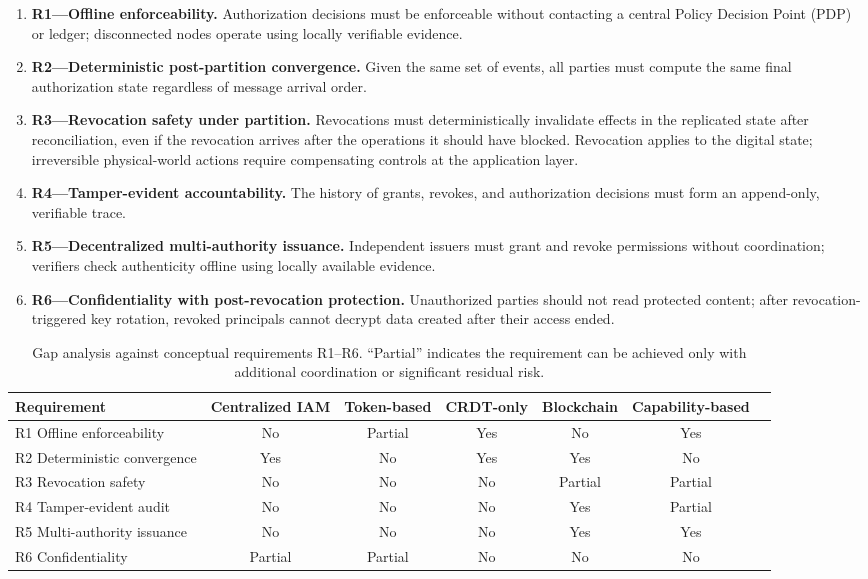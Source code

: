 \documentclass[10pt,journal,compsoc]{IEEEtran}
\begin{document}
\begin{enumerate}
    \item \textbf{R1---Offline enforceability.} Authorization decisions must be enforceable without contacting a central Policy Decision Point (PDP) or ledger; disconnected nodes operate using locally verifiable evidence.
    \item \textbf{R2---Deterministic post-partition convergence.} Given the same set of events, all parties must compute the same final authorization state regardless of message arrival order.
    \item \textbf{R3---Revocation safety under partition.} Revocations must deterministically invalidate effects in the replicated state after reconciliation, even if the revocation arrives after the operations it should have blocked. Revocation applies to the digital state; irreversible physical-world actions require compensating controls at the application layer.
    \item \textbf{R4---Tamper-evident accountability.} The history of grants, revokes, and authorization decisions must form an append-only, verifiable trace.
    \item \textbf{R5---Decentralized multi-authority issuance.} Independent issuers must grant and revoke permissions without coordination; verifiers check authenticity offline using locally available evidence.
    \item \textbf{R6---Confidentiality with post-revocation protection.} Unauthorized parties should not read protected content; after revocation-triggered key rotation, revoked principals cannot decrypt data created after their access ended.
\end{enumerate}

\begin{table}[!t]
\centering
\caption{Gap analysis against conceptual requirements R1--R6. ``Partial'' indicates the requirement can be achieved only with additional coordination or significant residual risk.}
\label{tab:gap-summary}
\footnotesize
\setlength{\tabcolsep}{4pt}
\renewcommand{\arraystretch}{1.25}
\begin{tabular}{p{3.8cm} cccccc}
\toprule
\textbf{Requirement} & \textbf{Centralized IAM} & \textbf{Token-based} & \textbf{CRDT-only} & \textbf{Blockchain} & \textbf{Capability-based} \\
\midrule
R1 Offline enforceability        & No      & Partial & Yes     & No       & Yes     \\
R2 Deterministic convergence     & Yes     & No      & Yes     & Yes      & No      \\
R3 Revocation safety             & No      & No      & No      & Partial  & Partial \\
R4 Tamper-evident audit          & No      & No      & No      & Yes      & Partial \\
R5 Multi-authority issuance      & No      & No      & No      & Yes      & Yes     \\
R6 Confidentiality               & Partial & Partial & No      & No       & No      \\
\bottomrule
\end{tabular}
\end{table}
\end{document}
